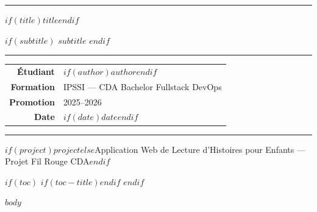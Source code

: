 \documentclass[
$if(fontsize)$
  $fontsize$,
$endif$
$if(papersize)$
  $papersize$paper,
$endif$
]{$documentclass$}
\begin{document}
\begin{titlepage}
  \thispagestyle{empty}
  \begin{center}
    \vspace*{2cm}
    {\color{accentblue}\rule{\linewidth}{3pt}}
    \vspace{0.6cm}

    {\fontsize{24}{30}\selectfont\bfseries\color{accentblue}
      $if(title)$$title$$endif$
    }
    \vspace{0.4cm}

    $if(subtitle)$
    {\large\color{mutedtext}\textit{$subtitle$}}
    \vspace{0.3cm}
    $endif$

    {\color{accentblue}\rule{\linewidth}{1pt}}
    \vspace{2.5cm}

    \begin{mdframed}[
      linecolor=bordercolor,
      backgroundcolor=lightblue,
      linewidth=1pt,
      innertopmargin=16pt,
      innerbottommargin=16pt,
      innerleftmargin=20pt,
      innerrightmargin=20pt,
    ]
    \begin{center}
      \begin{tabular}{rl}
        \textbf{\color{accentblue}Étudiant}  & $if(author)$$author$$endif$ \\[4pt]
        \textbf{\color{accentblue}Formation} & IPSSI — CDA Bachelor Fullstack DevOps \\[4pt]
        \textbf{\color{accentblue}Promotion} & 2025–2026 \\[4pt]
        \textbf{\color{accentblue}Date}      & $if(date)$$date$$endif$ \\
      \end{tabular}
    \end{center}
    \end{mdframed}

    \vfill
    {\color{accentblue}\rule{\linewidth}{3pt}}
    \vspace{0.3cm}
    {\small\color{mutedtext}$if(project)$$project$$else$Application Web de Lecture d'Histoires pour Enfants — Projet Fil Rouge CDA$endif$}
  \end{center}
\end{titlepage}

$if(toc)$
\newpage
{
  \hypersetup{linkcolor=black}
  \setcounter{tocdepth}{$if(toc-depth)$$toc-depth$$else$3$endif$}
  $if(toc-title)$\renewcommand*\contentsname{$toc-title$}$endif$
  \tableofcontents
}
\newpage
$endif$

$body$
\end{document}
